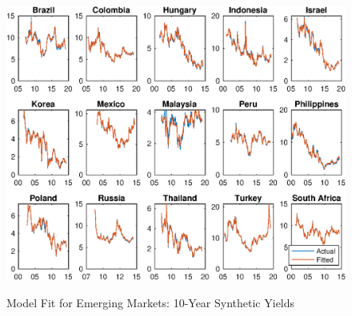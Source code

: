 \documentclass{article}
\begin{document}
\begin{figure}[tbph]
	\begin{center}
		\caption{Model Fit for Emerging Markets: 10-Year Synthetic Yields}
		\label{fig:s_ylds_ssb_yQ}
		\includegraphics[trim={0cm 0cm 0cm 0cm},clip,height=1\textheight,width=1.4\textwidth]{../Figures/Estimation/s_ylds_bsl_yQ.eps} \\
	\end{center}
\end{figure}
\end{document}
